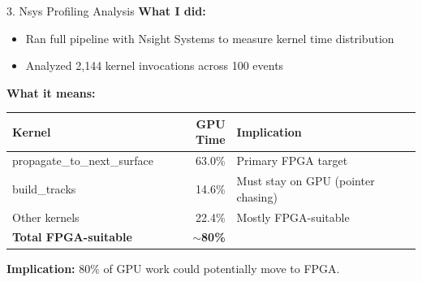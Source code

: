 \documentclass[aspectratio=169, table]{beamer}
\begin{document}
\begin{frame}{3. Nsys Profiling Analysis}
\textbf{What I did:}
\begin{itemize}
    \item Ran full pipeline with Nsight Systems to measure kernel time distribution
    \item Analyzed 2,144 kernel invocations across 100 events
\end{itemize}

\vspace{0.5em}
\textbf{What it means:}
\begin{table}
\small
\begin{tabular}{lrl}
    \toprule
    \textbf{Kernel} & \textbf{GPU Time} & \textbf{Implication} \\
    \midrule
    propagate\_to\_next\_surface & 63.0\% & Primary FPGA target \\
    build\_tracks & 14.6\% & Must stay on GPU (pointer chasing) \\
    Other kernels & 22.4\% & Mostly FPGA-suitable \\
    \midrule
    \textbf{Total FPGA-suitable} & \textbf{$\sim$80\%} & \\
    \bottomrule
\end{tabular}
\end{table}

\textbf{Implication:} 80\% of GPU work could potentially move to FPGA.
\end{frame}
\end{document}
